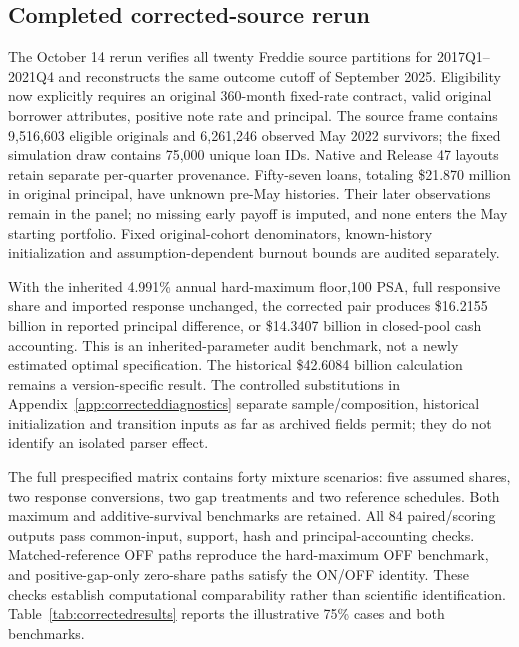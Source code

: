 \subsection{Completed corrected-source rerun}\label{sec:corrected}
The October 14 rerun verifies all twenty Freddie source partitions for 2017Q1--2021Q4 and reconstructs the same outcome cutoff of September 2025. Eligibility now explicitly requires an original 360-month fixed-rate contract, valid original borrower attributes, positive note rate and principal. The source frame contains 9,516,603 eligible originals and 6,261,246 observed May 2022 survivors; the fixed simulation draw contains 75,000 unique loan IDs. Native and Release 47 layouts retain separate per-quarter provenance. Fifty-seven loans, totaling \$21.870 million in original principal, have unknown pre-May histories. Their later observations remain in the panel; no missing early payoff is imputed, and none enters the May starting portfolio. Fixed original-cohort denominators, known-history initialization and assumption-dependent burnout bounds are audited separately.

With the inherited 4.991\% annual hard-maximum floor,100 PSA, full responsive share and imported response unchanged, the corrected pair produces \$16.2155 billion in reported principal difference, or \$14.3407 billion in closed-pool cash accounting. This is an inherited-parameter audit benchmark, not a newly estimated optimal specification. The historical \$42.6084 billion calculation remains a version-specific result. The controlled substitutions in Appendix~\ref{app:correcteddiagnostics} separate sample/composition, historical initialization and transition inputs as far as archived fields permit; they do not identify an isolated parser effect.

The full prespecified matrix contains forty mixture scenarios: five assumed shares, two response conversions, two gap treatments and two reference schedules. Both maximum and additive-survival benchmarks are retained. All 84 paired/scoring outputs pass common-input, support, hash and principal-accounting checks. Matched-reference OFF paths reproduce the hard-maximum OFF benchmark, and positive-gap-only zero-share paths satisfy the ON/OFF identity. These checks establish computational comparability rather than scientific identification. Table~\ref{tab:correctedresults} reports the illustrative 75\% cases and both benchmarks.

